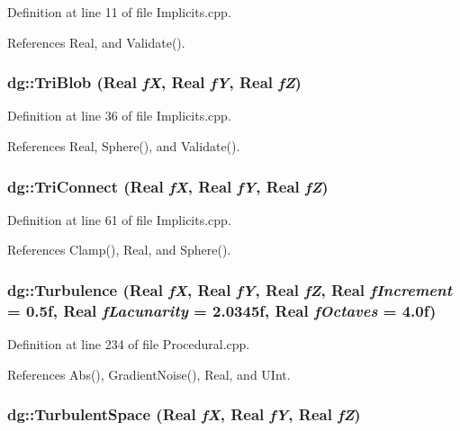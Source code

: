 Definition at line 11 of file Implicits.cpp.

References Real, and Validate().
\subsubsection{ dg::Tri\-Blob ({\bf Real} {\em f\-X}, {\bf Real} {\em f\-Y}, {\bf Real} {\em f\-Z})}\label{namespacedg_a69}




Definition at line 36 of file Implicits.cpp.

References Real, Sphere(), and Validate().
\subsubsection{ dg::Tri\-Connect ({\bf Real} {\em f\-X}, {\bf Real} {\em f\-Y}, {\bf Real} {\em f\-Z})}\label{namespacedg_a76}




Definition at line 61 of file Implicits.cpp.

References Clamp(), Real, and Sphere().
\subsubsection{ dg::Turbulence ({\bf Real} {\em f\-X}, {\bf Real} {\em f\-Y}, {\bf Real} {\em f\-Z}, {\bf Real} {\em f\-Increment} = 0.5f, {\bf Real} {\em f\-Lacunarity} = 2.0345f, {\bf Real} {\em f\-Octaves} = 4.0f)}\label{namespacedg_a131}




Definition at line 234 of file Procedural.cpp.

References Abs(), Gradient\-Noise(), Real, and UInt.
\subsubsection{ dg::Turbulent\-Space ({\bf Real} {\em f\-X}, {\bf Real} {\em f\-Y}, {\bf Real} {\em f\-Z})}\label{namespacedg_a84}




